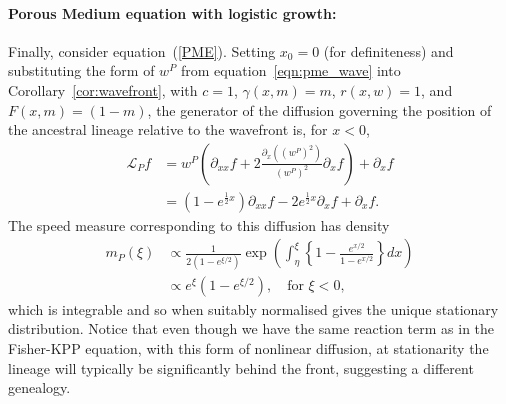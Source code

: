 \documentclass[12pt]{article}
\newcommand{\Lgen}{\mathcal{L}}    %
\numberwithin{equation}{section}
\begin{document}
\paragraph{Porous Medium equation with logistic growth:}
Finally, consider equation~(\ref{PME}). Setting $x_0=0$ (for definiteness) and substituting
the form of $w^P$ from equation~\eqref{eqn:pme_wave}
into Corollary~\ref{cor:wavefront},
with $c=1$,
$\gamma(x, m) = m$,
$r(x,w) = 1$,
and $F(x, m) = (1 - m)$,
the generator of the diffusion governing the position of the ancestral lineage relative to the wavefront
is, for $x < 0$,
\begin{align*}
    \Lgen_P f
    &=
        w^P
        \left(
        \partial_{xx} f
         +
         2 \frac{\partial_x((w^P)^2)}{(w^P)^2} \partial_xf
        \right)
        + \partial_xf \\
    &=
        \left(1 - e^{\frac{1}{2} x} \right)
        \partial_{xx}f
        -
        2 e^{\frac{1}{2} x} \partial_xf
        +
        \partial_xf .
\end{align*}
The speed measure corresponding to this diffusion has density
\begin{align*}
    m_P(\xi)
    &\propto
        \frac{ 1 }{ 2 (1 - e^{\xi/2}) }
        \exp\left(
            \int_\eta^\xi \left\{
                1 - \frac{e^{x/2}}{1 - e^{x/2}}
            \right\} dx
        \right) \\
    &\propto
        e^\xi\left(1-e^{\xi/2}\right),
        \quad
        \text{for } \xi < 0 ,
\end{align*}
which is integrable and so when suitably normalised gives the unique stationary distribution.
Notice that even though we have the same reaction term as in the Fisher-KPP equation, with this 
form of nonlinear diffusion, at stationarity
the lineage will typically be significantly behind the front, 
suggesting a different genealogy. 
\end{document}
